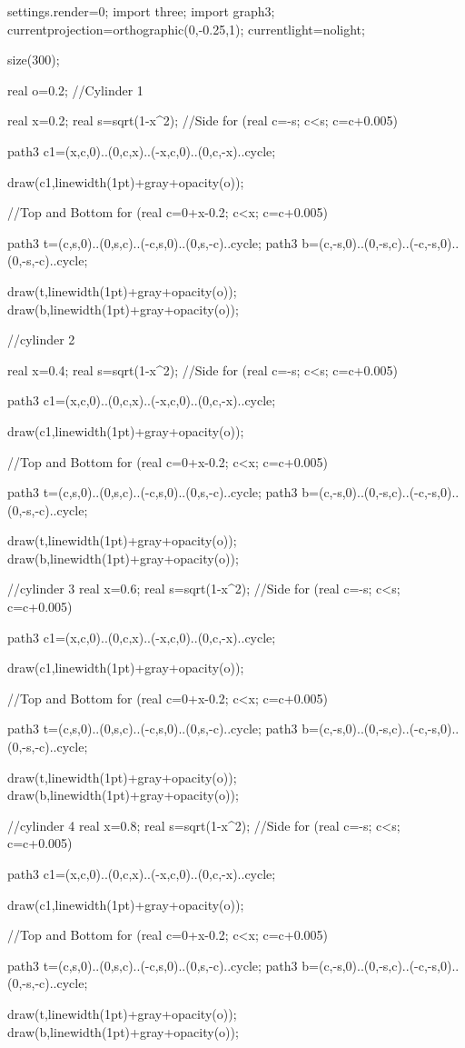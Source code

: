 
  	settings.render=0;
	import three;
    import graph3;
    currentprojection=orthographic(0,-0.25,1);
    currentlight=nolight;

	size(300);
	
	
	real o=0.2;
	//Cylinder 1
	
	real x=0.2;
	real s=sqrt(1-x^2);
	//Side
	for (real c=-s; c<s; c=c+0.005)
	{
		path3 c1=(x,c,0)..(0,c,x)..(-x,c,0)..(0,c,-x)..cycle;
		
		draw(c1,linewidth(1pt)+gray+opacity(o));
	}
	//Top and Bottom
	for (real c=0+x-0.2; c<x; c=c+0.005)
	{
		path3 t=(c,s,0)..(0,s,c)..(-c,s,0)..(0,s,-c)..cycle;
		path3 b=(c,-s,0)..(0,-s,c)..(-c,-s,0)..(0,-s,-c)..cycle;
		
		draw(t,linewidth(1pt)+gray+opacity(o));
		draw(b,linewidth(1pt)+gray+opacity(o));
	}
	
	
	//cylinder 2
	
	real x=0.4;
	real s=sqrt(1-x^2);
	//Side
	for (real c=-s; c<s; c=c+0.005)
	{
		path3 c1=(x,c,0)..(0,c,x)..(-x,c,0)..(0,c,-x)..cycle;
		
		draw(c1,linewidth(1pt)+gray+opacity(o));
	}
	//Top and Bottom
	for (real c=0+x-0.2; c<x; c=c+0.005)
	{
		path3 t=(c,s,0)..(0,s,c)..(-c,s,0)..(0,s,-c)..cycle;
		path3 b=(c,-s,0)..(0,-s,c)..(-c,-s,0)..(0,-s,-c)..cycle;
		
		draw(t,linewidth(1pt)+gray+opacity(o));
		draw(b,linewidth(1pt)+gray+opacity(o));
	}
	
	//cylinder 3
	real x=0.6;
	real s=sqrt(1-x^2);
	//Side
	for (real c=-s; c<s; c=c+0.005)
	{
		path3 c1=(x,c,0)..(0,c,x)..(-x,c,0)..(0,c,-x)..cycle;
		
		draw(c1,linewidth(1pt)+gray+opacity(o));
	}
	//Top and Bottom
	for (real c=0+x-0.2; c<x; c=c+0.005)
	{
		path3 t=(c,s,0)..(0,s,c)..(-c,s,0)..(0,s,-c)..cycle;
		path3 b=(c,-s,0)..(0,-s,c)..(-c,-s,0)..(0,-s,-c)..cycle;
		
		draw(t,linewidth(1pt)+gray+opacity(o));
		draw(b,linewidth(1pt)+gray+opacity(o));
	}
	//cylinder 4
	real x=0.8;
	real s=sqrt(1-x^2);
	//Side
	for (real c=-s; c<s; c=c+0.005)
	{
		path3 c1=(x,c,0)..(0,c,x)..(-x,c,0)..(0,c,-x)..cycle;
		
		draw(c1,linewidth(1pt)+gray+opacity(o));
	}
	//Top and Bottom
	for (real c=0+x-0.2; c<x; c=c+0.005)
	{
		path3 t=(c,s,0)..(0,s,c)..(-c,s,0)..(0,s,-c)..cycle;
		path3 b=(c,-s,0)..(0,-s,c)..(-c,-s,0)..(0,-s,-c)..cycle;
		
		draw(t,linewidth(1pt)+gray+opacity(o));
		draw(b,linewidth(1pt)+gray+opacity(o));
	}
	
